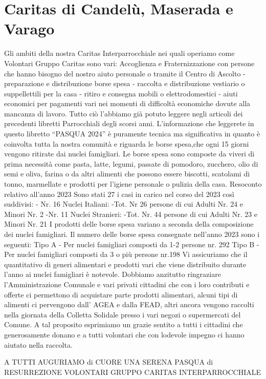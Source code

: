 \section{Caritas di Candelù, Maserada e Varago}
Gli ambiti della nostra Caritas Interparrocchiale nei quali operiamo come Volontari Gruppo Caritas sono vari: Accoglienza e Fraternizzazione con persone che hanno bisogno del nostro aiuto personale o tramite il Centro di Ascolto - preparazione e distribuzione borse spesa - raccolta e distribuzione vestiario o suppellettili per la casa - ritiro e consegna mobili o elettrodomestici - aiuti economici per pagamenti vari nei momenti di difficoltà economiche dovute alla mancanza di lavoro.                         
Tutto ciò l’abbiamo già potuto leggere negli articoli dei precedenti libretti Parrocchiali degli scorsi anni.
L’informazione che leggerete in questo libretto “PASQUA 2024” è puramente tecnica ma significativa in quanto è coinvolta  tutta la nostra comunità e riguarda le borse spesa,che ogni 15 giorni vengono ritirate dai nuclei famigliari.
Le borse spesa sono composte da viveri di prima necessità come pasta, latte, legumi, passate di pomodoro, zucchero, olio di semi e oliva, farina o da altri alimenti che possono essere biscotti, scatolami di tonno, marmellate e prodotti per l’igiene personale o pulizia della casa.
Resoconto relativo all’anno  2023
Sono stati 27 i casi in carico nel corso del 2023 così suddivisi:
- Nr. 16 Nuclei Italiani:
-Tot. Nr  26 persone di cui Adulti Nr. 24  e Minori Nr. 2
-Nr. 11 Nuclei Stranieri:
-Tot. Nr. 44 persone di cui Adulti Nr. 23 e  Minori Nr. 21
I prodotti delle borse spesa variano a seconda della composizione dei nuclei famigliari.
Il numero delle borse spesa consegnate nell’anno 2023 sono i seguenti:
Tipo A - Per nuclei famigliari composti da 1-2 persone nr. 292
Tipo B - Per nuclei famigliari composti da 3 o più persone nr.198
Vi assicuriamo che il quantitativo di generi alimentari e prodotti vari che viene distribuito durante l’anno ai nuclei famigliari è notevole.
Dobbiamo anzitutto ringraziare l’Amministrazione Comunale e vari privati cittadini che con i loro contributi e offerte ci permettono di acquistare parte prodotti alimentari, alcuni tipi di alimenti ci pervengono dall’ AGEA e dalla FEAD, altri ancora vengono raccolti nella giornata della Colletta Solidale presso i vari negozi o supermercati del Comune. A tal proposito esprimiamo un grazie sentito a tutti i cittadini che generosamente donano   e a tutti volontari che con lodevole impegno ci hanno aiutato nella raccolta.


A TUTTI AUGURIAMO di CUORE UNA SERENA PASQUA di RESURREZIONE
VOLONTARI GRUPPO CARITAS INTERPARROCCHIALE
